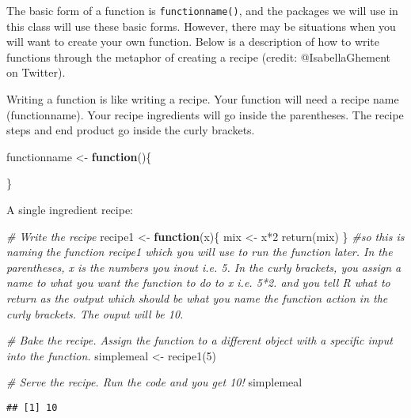\documentclass[
]{article}
\newenvironment{Shaded}{\begin{snugshade}}{\end{snugshade}}
\newcommand{\CommentTok}[1]{\textcolor[rgb]{0.56,0.35,0.01}{\textit{#1}}}
\newcommand{\ControlFlowTok}[1]{\textcolor[rgb]{0.13,0.29,0.53}{\textbf{#1}}}
\newcommand{\DecValTok}[1]{\textcolor[rgb]{0.00,0.00,0.81}{#1}}
\newcommand{\FunctionTok}[1]{\textcolor[rgb]{0.00,0.00,0.00}{#1}}
\newcommand{\NormalTok}[1]{#1}
\newcommand{\OtherTok}[1]{\textcolor[rgb]{0.56,0.35,0.01}{#1}}
\newcommand{\SpecialCharTok}[1]{\textcolor[rgb]{0.00,0.00,0.00}{#1}}
\begin{document}
The basic form of a function is \texttt{functionname()}, and the
packages we will use in this class will use these basic forms. However,
there may be situations when you will want to create your own function.
Below is a description of how to write functions through the metaphor of
creating a recipe (credit: @IsabellaGhement on Twitter).

Writing a function is like writing a recipe. Your function will need a
recipe name (functionname). Your recipe ingredients will go inside the
parentheses. The recipe steps and end product go inside the curly
brackets.

\begin{Shaded}
\begin{Highlighting}[]
\NormalTok{functionname }\OtherTok{\textless{}{-}} \ControlFlowTok{function}\NormalTok{()\{}
  
\NormalTok{\}}
\end{Highlighting}
\end{Shaded}

A single ingredient recipe:

\begin{Shaded}
\begin{Highlighting}[]
\CommentTok{\# Write the recipe}
\NormalTok{recipe1 }\OtherTok{\textless{}{-}} \ControlFlowTok{function}\NormalTok{(x)\{}
\NormalTok{  mix }\OtherTok{\textless{}{-}}\NormalTok{ x}\SpecialCharTok{*}\DecValTok{2}
  \FunctionTok{return}\NormalTok{(mix)}
\NormalTok{\}}
\CommentTok{\#so this is naming the function recipe1 which you will use to run the function later. In the parentheses, x is the numbers you inout i.e. 5. In the curly brackets, you assign a name to what you want the function to do to x i.e. 5*2. and you tell R what to return as the output which should be what you name the function action in the curly brackets. The ouput will be 10.}


\CommentTok{\# Bake the recipe. Assign the function to a different object with a specific input into the function.}
\NormalTok{simplemeal }\OtherTok{\textless{}{-}} \FunctionTok{recipe1}\NormalTok{(}\DecValTok{5}\NormalTok{)}

\CommentTok{\# Serve the recipe. Run the code and you get 10!}
\NormalTok{simplemeal}
\end{Highlighting}
\end{Shaded}

\begin{verbatim}
## [1] 10
\end{verbatim}
\end{document}
